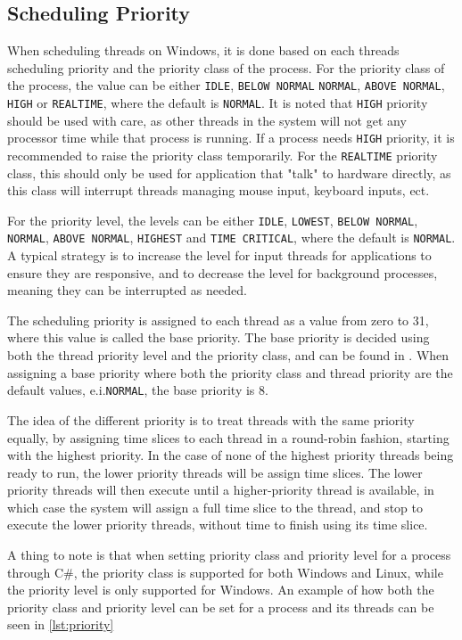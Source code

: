 \subsection{Scheduling Priority}

When scheduling threads on Windows, it is done based on each threads scheduling priority and the priority class of the process.  For the priority class of the process, the value can be either \texttt{IDLE}, \texttt{BELOW NORMAL} \texttt{NORMAL}, \texttt{ABOVE NORMAL}, \texttt{HIGH} or \texttt{REALTIME}, where the default is \texttt{NORMAL}. It is noted that \texttt{HIGH} priority should be used with care, as other threads in the system will not get any processor time while that process is running. If a process needs \texttt{HIGH} priority, it is recommended to raise the priority class temporarily. For the \texttt{REALTIME} priority class, this should only be used for application that "talk" to hardware directly, as this class will interrupt threads managing mouse input, keyboard inputs, ect.\cite{priority}\newline

For the priority level, the levels can be either \texttt{IDLE}, \texttt{LOWEST}, \texttt{BELOW NORMAL}, \texttt{NORMAL}, \texttt{ABOVE NORMAL}, \texttt{HIGHEST} and \texttt{TIME CRITICAL}, where the default is \texttt{NORMAL}. A typical strategy is to increase the level for input threads for applications to ensure they are responsive, and to decrease the level for background processes, meaning they can be interrupted as needed.\cite{priority}

The scheduling priority is assigned to each thread as a value from zero to 31, where this value is called the base priority. The base priority is decided using both the thread priority level and the priority class, and can be found in \cite{priority}. When assigning a base priority where both the priority class and thread priority are the default values, e.i.\texttt{NORMAL}, the base priority is $8$.\cite{priority}\newline

The idea of the different priority is to treat threads with the same priority equally, by assigning time slices to each thread in a round-robin fashion, starting with the highest priority. In the case of none of the highest priority threads being ready to run, the lower priority threads will be assign time slices. The lower priority threads will then execute until a higher-priority thread is available, in which case the system will assign a full time slice to the thread, and stop to execute the lower priority threads, without time to finish using its time slice.\cite{priority}



A thing to note is that when setting priority class and priority level for a process through C\#, the priority class is supported for both Windows and Linux, while the priority level is only supported for Windows. An example of how both the priority class and priority level can be set for a process and its threads can be seen in \cref{lst:priority}


